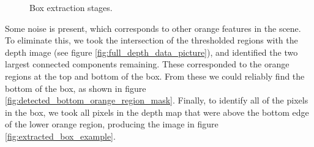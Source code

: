 \documentclass[12pt,a4paper,onecolumn]{article}
\begin{document}
\begin{figure}[!ht]
    \centering
      \quad

      \caption{Box extraction stages.}
\end{figure}

Some noise is present, which corresponds to other orange features in the scene.  To eliminate this, we took the intersection of the thresholded regions with the depth image (see figure \ref{fig:full_depth_data_picture}), and identified the two largest connected components remaining.  These corresponded to the orange regions at the top and bottom of the box.  From these we could reliably find the bottom of the box, as shown in figure \ref{fig:detected_bottom_orange_region_mask}.  Finally, to identify all of the pixels in the box, we took all pixels in the depth map that were above the bottom edge of the lower orange region, producing the image in figure \ref{fig:extracted_box_example}.
\end{document}
